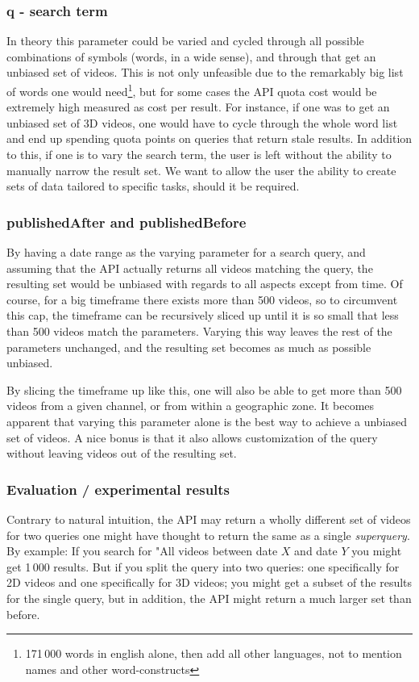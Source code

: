 \subsubsection{q - search term}
In theory this parameter could be varied and cycled through all possible
combinations of symbols (words, in a wide sense), and through that get an
unbiased set of videos. This is not only unfeasible due to the remarkably big
list of words one would need\footnote{171\,000 words in english alone, then add
all other languages, not to mention names and other word-constructs}, but for
some cases the API quota cost would be extremely high measured as cost per
result. For instance, if one was to get an unbiased set of 3D videos, one would
have to cycle through the whole word list and end up spending quota points on queries
that return stale results. In addition to this, if one is to vary the
search term, the user is left without the ability to manually narrow the result
set. We want to allow the user the ability to create sets of data tailored to
specific tasks, should it be required.

\subsubsection{publishedAfter and publishedBefore}
By having a date range as the varying parameter for a search query, and assuming
that the API actually returns all videos matching the query, the resulting set
would be unbiased with regards to all aspects except from time. Of course, for
a big timeframe there exists more than 500 videos, so to circumvent this cap,
the timeframe can be recursively sliced up until it is so small that less than
500 videos match the parameters. Varying this way leaves the rest of the
parameters unchanged, and the resulting set becomes as much as possible
unbiased.

By slicing the timeframe up like this, one will also be able to get more than
500 videos from a given channel, or from within a geographic zone. It becomes
apparent that varying this parameter alone is the best way to achieve a unbiased
set of videos. A nice bonus is that it also allows customization of the query
without leaving videos out of the resulting set.

\subsubsection{Evaluation / experimental results}
Contrary to natural intuition, the API may return a wholly different set of
videos for two queries one might have thought to return the same as a single
\textit{superquery}. By example: If you search for "All videos between date
$X$ and date $Y$ you might get 1\,000 results. But if you split the query into
two queries: one specifically for 2D videos and one specifically for 3D videos;
you might get a subset of the results for the single query, but in addition,
the API might return a much larger set than before.

